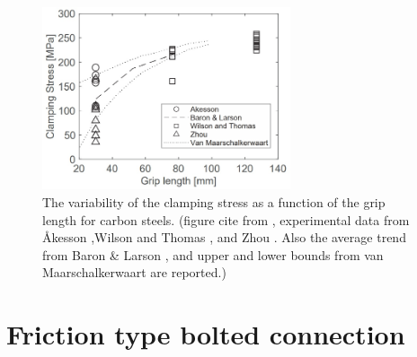 \begin{figure}[htbp]
    \centering
    \includegraphics[width=0.65\textwidth]{imgs/ch2/preload-rivet.pdf}
    \caption[The variability of the clamping stress as a function of the grip length for carbon steels.]{The variability of the clamping stress as a function of the grip length for carbon steels. (figure cite from \cite{Leonetti2020RivetBridges}, experimental data from Åkesson \cite{Akesson2010},Wilson and Thomas \cite{Wilson1938FatigueJoints}, and Zhou \cite{Zhou1994FatigueMembers}. Also the average trend from Baron \& Larson \cite{Baron1953TheJoints}, and upper and lower bounds from van Maarschalkerwaart \cite{VanMaarschalkerwaart1982FatigueJoints} are reported.)}
    \label{fig-preload-rivet}
\end{figure}



\section{Friction type bolted connection}

